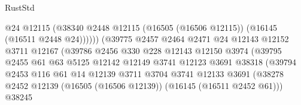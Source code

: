 \begin{lexlean}{RustStd}
\begin{coremodule}
                                            @24
                                            @12115
                                            (@38340
                                              @2448
                                              @12115
                                              (@16505 (@16506 @12115))
                                              (@16145 (@16511 @2448 @24))))))
                                      (@39775
                                        @2457
                                        @2464
                                        @2471
                                        @24
                                        @12143
                                        @12152
                                        @3711
                                        @12167
                                        (@39786
                                          @2456
                                          @330
                                          @228
                                          @12143
                                          @12150
                                          @3974
                                          (@39795
                                            @2455
                                            @61
                                            @63
                                            @5125
                                            @12142
                                            @12149
                                            @3741
                                            @12123
                                            @3691
                                            @38318
                                            (@39794
                                              @2453
                                              @116
                                              @61
                                              @14
                                              @12139
                                              @3711
                                              @3704
                                              @3741
                                              @12133
                                              @3691
                                              (@38278
                                                @2452
                                                @12139
                                                (@16505 (@16506 @12139))
                                                (@16145 (@16511 @2452 @61)))
                                              @38245

\end{coremodule}
\end{lexlean}
